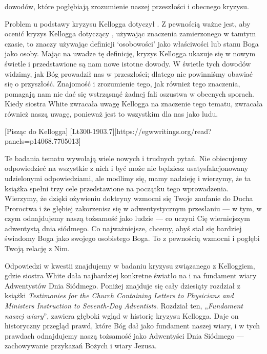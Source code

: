 dowodów, które pogłębiają zrozumienie naszej przeszłości i obecnego kryzysu.

Problem u podstawy kryzysu Kellogga dotyczył . Z pewnością ważne jest, aby ocenić kryzys Kellogga dotyczący , używając znaczenia zamierzonego w tamtym czasie, to znaczy używając definicji ‘osobowości’ jako właściwości lub stanu Boga jako osoby. Mając na uwadze tę definicję, kryzys Kellogga ukazuje się w nowym świetle i przedstawione są nam nowe istotne dowody. W świetle tych dowodów widzimy, jak Bóg prowadził nas w przeszłości; dlatego nie powinniśmy obawiać się o przyszłość. Znajomość i zrozumienie tego, jak również tego znaczenia, pomagają nam nie dać się wstrząsnąć żadnej fali oszustwa w obecnych sporach. Kiedy siostra White zwracała uwagę Kellogga na znaczenie tego tematu, zwracała również naszą uwagę, ponieważ jest to wszystkim dla nas jako ludu.

[Pisząc do Kellogga] [Lt300-1903.7][https://egwwritings.org/read?panels=p14068.7705013]

Te badania tematu  wywołają wiele nowych i trudnych pytań. Nie obiecujemy odpowiedzieć na wszystkie z nich i być może nie będziesz usatysfakcjonowany udzielonymi odpowiedziami, ale modlimy się, mamy nadzieję i wierzymy, że ta książka spełni trzy cele przedstawione na początku tego wprowadzenia. Wierzymy, że dzięki ożywieniu doktryny  wzmocni się Twoje zaufanie do Ducha Proroctwa i że głębiej zakorzenisz się w adwentystycznym przesłaniu — w tym, w czym odnajdujemy naszą tożsamość jako ludzie — co uczyni Cię wierniejszym adwentystą dnia siódmego. Co najważniejsze, chcemy, abyś stał się bardziej świadomy Boga jako swojego osobistego Boga. To z pewnością wzmocni i pogłębi Twoją relację z Nim.

Odpowiedzi w kwestii  znajdujemy w badaniu kryzysu związanego z Kelloggiem, gdzie siostra White dała najbardziej konkretne światło na  i na fundament wiary Adwentystów Dnia Siódmego. Poniżej znajduje się cały dziesiąty rozdział z książki \textit{Testimonies for the Church Containing Letters to Physicians and Ministers Instruction to Seventh-Day Adventists}. Rozdział ten, „\textit{Fundament naszej wiary}”, zawiera głęboki wgląd w historię kryzysu Kellogga. Daje on historyczny przegląd prawd, które Bóg dał jako fundament naszej wiary, i w tych prawdach odnajdujemy naszą tożsamość jako Adwentyści Dnia Siódmego — zachowywanie przykazań Bożych i wiary Jezusa.